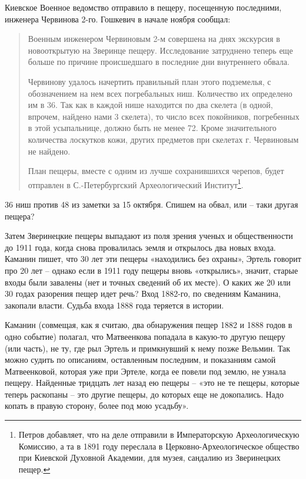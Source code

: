 Киевское Военное ведомство отправило в пещеру, посещенную последними, инженера Червинова 2-го. Гошкевич в начале ноября сообщал:

\begin{quotation}
Военным инженером Червиновым 2-м совершена на днях экскурсия в новооткрытую на Зверинце пещеру. Исследование затруднено теперь еще больше по причине происшедшаго в последние дни внутреннего обвала.

Червинову удалось начертить правильный план этого подземелья, с обозначением на нем всех погребальных ниш. Количество их определено им в 36. Так как в каждой нише находится по два скелета (в одной, впрочем, найдено нами 3 скелета), то число всех покойников, погребенных в этой усыпальнице, должно быть не менее 72. Кроме значительного количества лоскутков кожи, других предметов при скелетах г. Червиновым не найдено.

План пещеры, вместе с одним из лучше сохранившихся черепов, будет отправлен в С.-Пе\-тербургский Археологический Институт\footnote{Петров добавляет, что на деле отправили в Императорскую Археологическую Комиссию, а та в 1891 году переслала в Церковно-Археологическое общество при Киевской Духовной Академии, для музея, сандалию из Зверинецких пещер.}.
\end{quotation}

36 ниш против 48 из заметки за 15 октября. Спишем на обвал, или – таки другая пещера?

Затем Зверинецкие пещеры выпадают из поля зрения ученых и общественности до 1911 года,  когда снова провалилась земля и открылось два новых входа. Каманин пишет, что 30 лет эти пещеры «находились без охраны», Эртель говорит про 20 лет – однако если в 1911 году пещеры вновь «открылись», значит, старые входы были завалены (нет и точных сведений об их месте). О каких же 20 или 30 годах разорения пещер идет речь? Вход 1882-го, по сведениям Каманина, закопали власти. Судьба входа 1888 года теряется в истории.


Каманин (совмещая, как я считаю, два обнаружения пещер 1882 и 1888 годов в одно событие) полагал, что Матвеенкова попадала в какую-то другую пещеру (или часть), не ту, где рыл Эртель и примкнувший к нему позже Вельмин. Так можно судить по описаниям, оставленным последним, и показаниям самой Матвеенковой, которая уже при Эртеле, когда ее повели под землю, не узнала пещеру. Найденные тридцать лет назад ею пещеры – «это не те пещеры, которые теперь раскопаны – это другие пещеры, до которых еще не докопались. Надо копать в правую сторону, более под мою усадьбу».

